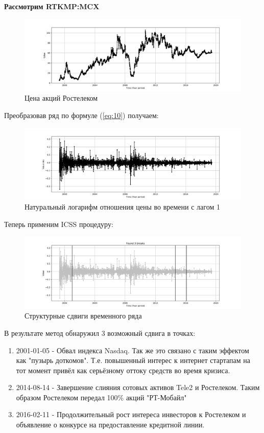 \documentclass[a4paper,14pt,russian]{extarticle}
\begin{document}
	
	\textbf{Рассмотрим RTKMP:MCX}
	
	\begin{figure}[H]
		\includegraphics[width=\linewidth]{source_ts_RTKMP.png}
		\caption{\label{fig:6} Цена акций Ростелеком}
	\end{figure}
	Преобразовав ряд по формуле (\ref{eq:10}) получаем:
	\begin{figure}[H]
		\includegraphics[width=\linewidth]{source_ln_ts_RTKMP.png}
		\caption{\label{fig:7} Натуральный логарифм отношения цены во времени с лагом 1}
	\end{figure}
	Теперь применим ICSS процедуру:
	\begin{figure}[H]
		\includegraphics[width=\linewidth]{ru_stock_simulation_RTKMP.png}
		\caption{\label{fig:8} Структурные сдвиги временного ряда}
	\end{figure}
	В результате метод обнаружил 3 возможный сдвига в точках:
	\begin{enumerate}
		\item 2001-01-05 - Обвал индекса Nasdaq. Так же это связано с таким эффектом как "пузырь доткомов". Т.е. повышенный интерес к интернет стартапам на тот момент привёл как серьёзному оттоку средств во время кризиса.
		\item 2014-08-14 - Завершение слияния сотовых активов Tele2 и Ростелеком. Таким образом Ростелеком передал 100\% акций "РТ-Мобайл"
		\item 2016-02-11 - Продолжительный рост интереса инвесторов к Ростелеком и объявление о конкурсе на предоставление кредитной линии.
	\end{enumerate}
	
\end{document}
